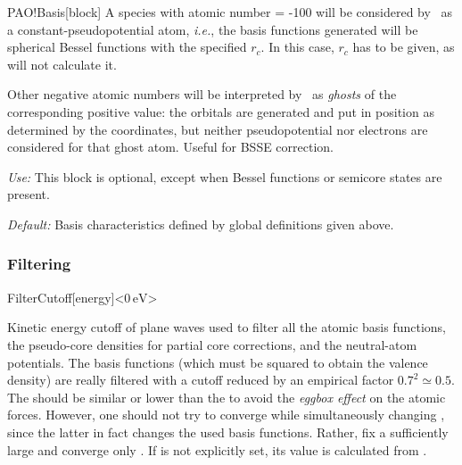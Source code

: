 \begin{fdfentry}{PAO!Basis}[block]
A species with atomic number = -100 will be considered by \siesta\ as
a constant-pseudopotential atom, \textit{i.e.}, the basis functions
generated will be spherical Bessel functions
with the specified $r_c$. In this case, $r_c$ has to be given, as
 will not calculate it.

Other negative atomic numbers will be interpreted by \siesta\ as
\textit{ghosts}
of the corresponding positive value: the orbitals
are generated and put in position as determined by the coordinates,
but neither pseudopotential nor electrons are considered for that
ghost atom. Useful for BSSE correction.

\textit{Use:} This block is optional, except when Bessel functions or
semicore states are present.

\textit{Default:} Basis characteristics defined by global definitions given
above.

\end{fdfentry}

\subsubsection{Filtering}
\label{sec:filtering}

\begin{fdfentry}{FilterCutoff}[energy]<$0\,\mathrm{eV}$>

  Kinetic energy cutoff of plane waves used to filter all the atomic
  basis functions, the pseudo-core densities for partial core
  corrections, and the neutral-atom potentials.  The basis functions
  (which must be squared to obtain the valence density) are really
  filtered with a cutoff reduced by an empirical factor
  $0.7^2 \simeq 0.5$. The  should be similar or
  lower than the  to avoid the \emph{eggbox
      effect} on the atomic forces.  However, one should not try to
  converge  while simultaneously changing
  , since the latter in fact changes the used
  basis functions. Rather, fix a sufficiently large
   and converge only .  If
   is not explicitly set, its value is calculated
  from .

\end{fdfentry}

